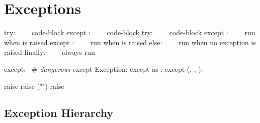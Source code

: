 \documentclass{refcard}
\begin{document}
\section{Exceptions}

\begin{ldesc}
		try: \li
		~~~~code-block \li
		except : \li
		~~~~code-block \li
		try: \li
		~~~~code-block \li
		except : \li
		~~~~\textnormal{run when  is raised} \li
		except : \li
		~~~~\textnormal{run when  is raised} \li
		else: \li
		~~~~\textnormal{run when no exception is raised} \li
		finally: \li
		~~~~always-run \li

	   except: ~\# \textnormal{\emph{dangerous}}
	  except Exception:
	\li[catch as]                  except  as :
	 except (, , ): \li
	  

	       raise 
	    raise ("")
	  raise
\end{ldesc}

\subsection{Exception Hierarchy}
\end{document}
